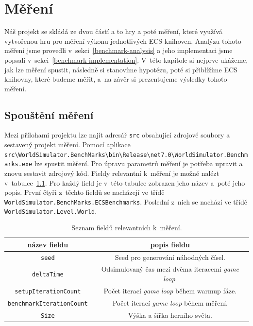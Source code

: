 \chapter{Měření}
\label{chap:benchmark}
Náš projekt se skládá ze dvou částí a to hry a poté měření, které využívá vytvořenou hru pro měření výkonu jednotlivých ECS knihoven. Analýzu tohoto měření jsme provedli v~sekci~\ref{benchmark-analysis} a jeho implementaci jsme popsali v~sekci~\ref{benchmark-implementation}. V~této kapitole si nejprve ukážeme, jak lze měření spustit, následně si stanovíme hypotézu, poté si přiblížíme ECS knihovny, které budeme měřit, a~na závěr si prezentujeme výsledky tohoto měření.

\section{Spouštění měření}
Mezi přílohami projektu lze najít adresář \texttt{src} obsahující zdrojové soubory a sestavený projekt měření. Pomocí aplikace \texttt{src\textbackslash WorldSimulator.BenchMarks\textbackslash bin\textbackslash Release\textbackslash net7.0\textbackslash WorldSimulator.Benchmarks.exe} lze spustit měření. Pro úpravu parametrů měření je potřeba upravit a znovu sestavit zdrojový kód. Fieldy relevantní k~měření je možné nalézt v~tabulce~\ref{tab:benchmark-relevant-fields}. Pro každý field je v~této tabulce zobrazen jeho název a~poté jeho popis. První čtyři z~těchto fieldů se nacházejí ve třídě \texttt{WorldSimulator.BenchMarks.ECSBenchmarks}. Poslední z~nich se nachází ve třídě \texttt{WorldSimulator.Level.World}.

\begin{table}[!htb]
    \centering\footnotesize\sf
    \begin{tabular}{c c}
        \toprule
        název fieldu & popis fieldu \\
        \midrule

        \texttt{seed} & Seed pro generování náhodných čísel. \\

        \texttt{deltaTime} & Odsimulovaný čas mezi dvěma iteracemi \textit{game loop}. \\

        \texttt{setupIterationCount} & Počet iterací \textit{game loop} během warmup fáze. \\

        \texttt{benchmarkIterationCount} & Počet iterací \textit{game loop} během měření. \\

        \texttt{Size} & Výška a šířka herního světa. \\
        \bottomrule
    \end{tabular}
    \caption{Seznam fieldů relevantních k~měření.}
    \label{tab:benchmark-relevant-fields}
\end{table}


